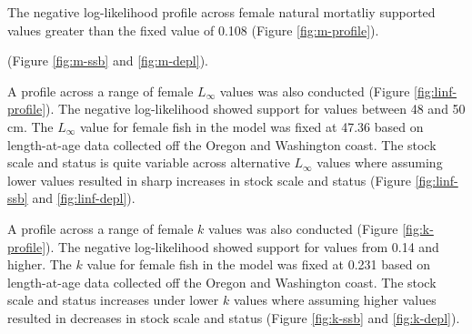 \documentclass[11pt,
  english,
  a4paper,
]{article}
\begin{document}
\leavevmode\tagmcend\tagstructend\par


The negative log-likelihood profile across female natural mortatliy supported values greater than the fixed value of 0.108 (Figure \ref{fig:m-profile}).

\leavevmode\tagmcend\tagstructend\par


(Figure \ref{fig:m-ssb} and \ref{fig:m-depl}).

\leavevmode\tagmcend\tagstructend\par


A profile across a range of female {\(L_{\infty}\)\leavevmode\tagmcend\tagstructend} values was also conducted (Figure \ref{fig:linf-profile}). The negative log-likelihood showed support for values between 48 and 50 cm. The {\(L_{\infty}\)\leavevmode\tagmcend\tagstructend} value for female fish in the model was fixed at 47.36 based on length-at-age data collected off the Oregon and Washington coast. The stock scale and status is quite variable across alternative {\(L_{\infty}\)\leavevmode\tagmcend\tagstructend} values where assuming lower values resulted in sharp increases in stock scale and status (Figure \ref{fig:linf-ssb} and \ref{fig:linf-depl}).

\leavevmode\tagmcend\tagstructend\par


A profile across a range of female {\(k\)\leavevmode\tagmcend\tagstructend} values was also conducted (Figure \ref{fig:k-profile}). The negative log-likelihood showed support for values from 0.14 and higher. The {\(k\)\leavevmode\tagmcend\tagstructend} value for female fish in the model was fixed at 0.231 based on length-at-age data collected off the Oregon and Washington coast. The stock scale and status increases under lower {\(k\)\leavevmode\tagmcend\tagstructend} values where assuming higher values resulted in decreases in stock scale and status (Figure \ref{fig:k-ssb} and \ref{fig:k-depl}).
\end{document}
